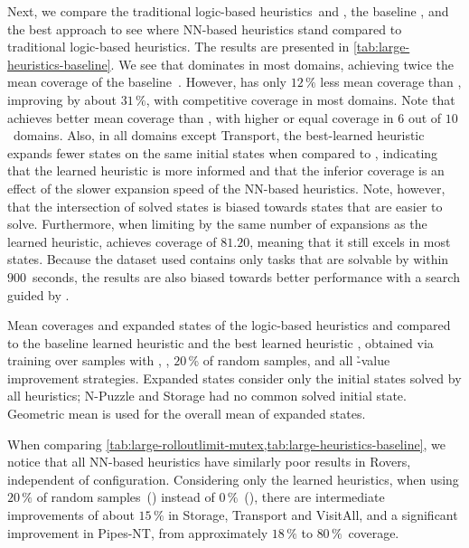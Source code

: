 Next, we compare the traditional logic-based heuristics~\hff and \hgc, the baseline \hnnbase, and the best approach \hnnrs to see where NN-based heuristics stand compared to traditional logic-based heuristics. The results are presented in \cref{tab:large-heuristics-baseline}. We see that \hff dominates in most domains, achieving twice the mean coverage of the baseline~\hnnbase. However, \hnnrs has only $12\,\%$ less mean coverage than \hff, improving \hnnbase by about $31\,\%$, with competitive coverage in most domains. Note that \hnnrs achieves better mean coverage than \hgc, with higher or equal coverage in $6$ out of $10$~domains. Also, in all domains except Transport, the best-learned heuristic expands fewer states on the same initial states when compared to \hff, indicating that the learned heuristic is more informed and that the inferior coverage is an effect of the slower expansion speed of the NN-based heuristics. Note, however, that the intersection of solved states is biased towards states that are easier to solve. Furthermore, when limiting \hff by the same number of expansions as the learned heuristic, \hff achieves coverage of $81.20$, meaning that it still excels in most states. Because the dataset used contains only tasks that are solvable by \hff within $900$~seconds, the results are also biased towards better performance with a search guided by \hff. 

\begin{table}[ht]
    \caption[Results of the logic-based, baseline, and the best learned heuristics.]{Mean coverages and expanded states of the logic-based heuristics \hff and \hgc compared to the baseline learned heuristic \hnnbase and the best learned heuristic \hnnrs, obtained via training over samples with \bfsrw, \rlmeanfx, $20$\,\% of random samples, and all \h-value improvement strategies. Expanded states consider only the initial states solved by all heuristics; N-Puzzle and Storage had no common solved initial state. Geometric mean is used for the overall mean of expanded states.}
    \label{tab:large-heuristics-baseline}
    \addmargin
    \centering
    
\end{table}

When comparing \cref{tab:large-rolloutlimit-mutex,tab:large-heuristics-baseline}, we notice that all NN-based heuristics have similarly poor results in Rovers, independent of configuration. Considering only the learned heuristics, when using $20\,\%$ of random samples~(\hnnrs) instead of $0\,\%$~(\hnnl{\rlmeanfx}), there are intermediate improvements of about $15\,\%$ in Storage, Transport and VisitAll, and a significant improvement in Pipes-NT, from approximately $18\,\%$ to $80\,\%$~coverage.

